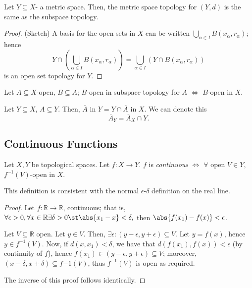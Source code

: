 \begin{proposition}
    Let $Y \subseteq X$- a metric space. Then, the metric space topology for $(Y, d)$ is the same as the subspace topology.
\end{proposition}

\begin{proof}(Sketch) 
    A basis for the open sets in $X$ can be written $\bigcup_{\alpha \in I} B(x_\alpha, r_\alpha)$; hence $$Y \cap (\bigcup_{\alpha \in I} B(x_\alpha, r_\alpha)) =  \bigcup_{\alpha\in I} (Y \cap B(x_\alpha, r_\alpha))$$ is an open set topology for $Y$.
\end{proof}

\begin{lemma}
    Let $A \subseteq X$-open, $B \subseteq A$; $B$-open in subspace topology for $A$ $\iff$ $B$-open in $X$.
\end{lemma}

\begin{lemma}
    Let $Y \subseteq X$, $A\subseteq Y$. Then, $\overline{A}$ in $Y = Y \cap \overline{A}$ in $X$. We can denote this \[
    \overline{A}_Y = \overline{A}_X  \cap Y.   
    \]
\end{lemma}

\subsection{Continuous Functions}

\begin{definition}
    Let $X, Y$ be topological spaces. Let $f: X \to Y$. $f$ is \emph{continuous} $\iff$ $\forall$ open $V \in Y$, $f^{-1}(V)$-open in $X$.
\end{definition}


\begin{proposition}
    This definition is consistent with the normal $\epsilon$-$\delta$ definition on the real line.
\end{proposition}

\begin{proof}
    Let $f: \mathbb{R} \to \mathbb{R}$, continuous; that is, $\forall \epsilon > 0, \forall x \in \mathbb{R} \exists \delta > 0 \st \abs{x_1 - x} < \delta, $ then $\abs{f(x_1) - f(x)} < \epsilon$.

    Let $V \subseteq \mathbb{R}$ open. Let $y \in V$. Then, $\exists \epsilon : (y - \epsilon, y + \epsilon) \subseteq V$. Let $y = f(x)$, hence $y \in f^{-1}(V)$. Now, if $d(x, x_1) < \delta$, we have that $d(f(x_1), f(x)) < \epsilon$ (by continuity of $f$), hence $f(x_1) \in (y - \epsilon, y + \epsilon) \subseteq V$; moreover, $(x - \delta, x + \delta) \subseteq f{-1}(V)$, thus $f^{-1}(V)$ is open as required.

    The inverse of this proof follows identically.
\end{proof}